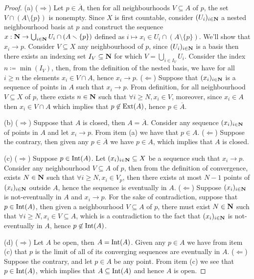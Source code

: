 \begin{proof}
(a) (\(\Rightarrow\)) Let \(p \in \overline A\), then for all neighbourhoods
\(V \subseteq A\) of \(p\), the set \(V \cap (A \setminus \{p\})\) is
nonempty. Since \(X\) is first countable, consider \((U_i)_{i \in \mathbf{N}}\) a nested
neighbourhood basis at \(p\) and construct the sequence \(x : \mathbf{N} \to \bigcup_{i
\in \mathbf{N}} U_i \cap (A \smallsetminus \{p\}) \) defined as \(i \mapsto x_i \in U_i \cap
(A \setminus \{p\})\). We'll show that \(x_i \to p\). Consider \(V \subseteq X\)
any neighbourhood of \(p\), since \((U_i)_{i \in \mathbf{N}}\) is a basis then there
exists an indexing set \(I_{V} \subseteq \mathbf{N}\) for which \(V = \bigcup_{i \in
I_V} U_i\).  Consider the index \(n \coloneq \min(I_V)\), then, from the
definition of the nested basis, we have for all \(i \geq n\) the elements \(x_i
\in V \cap A\), hence \(x_i \to p\).
(\(\Leftarrow\)) Suppose that \((x_i)_{i \in \mathbf{N}}\) is a sequence of points in
\(A\) such that \(x_i \to p\). From definition, for all neighbourhood \(V
\subseteq X\) of \(p\), there exists \(n \in \mathbf{N}\) such that \(\forall i \geq N,
x_i \in V\), moreover, since \(x_i \in A\) then \(x_i \in V \cap A\) which
implies that \(p \not\in \operatorname{Ext}(A)\), hence \(p \in \overline A\).

(b) (\(\Rightarrow\)) Suppose that \(A\) is closed, then \(A = \overline A\).
Consider any sequence \((x_i)_{i \in \mathbf{N}}\) of points in \(A\) and let
\(x_i \to p\). From item (a) we have that \(p \in A\). (\(\Leftarrow\))
Suppose the contrary, then given any \(p \in \overline A\) we have \(p \in
A\), which implies that \(A\) is closed.

(c) (\(\Rightarrow\)) Suppose \(p \in \operatorname{Int}(A)\). Let \((x_i)_{i \in
\mathbf{N}} \subseteq X\) be a sequence such that \(x_i \to p\). Consider any
neighbourhood \(V \subseteq A\) of \(p\), then from the definition of
convergence, exists \(N \in \mathbf{N}\) such that \(\forall i \geq N, x_i \in
V_p\), then there exists at most \(N - 1\) points of \((x_i)_{i \in
\mathbf{N}}\) outside \(A\), hence the sequence is eventually in \(A\).
(\(\Leftarrow\)) Suppose \((x_i)_{i \in \mathbf{N}}\) is not-eventually in
\(A\) and \(x_i \to p\). For the sake of contradiction, suppose that \(p \in
\operatorname{Int}(A)\), then given a neighbourhood \(V \subseteq A\) of \(p\), there must
exist \(N \in \mathbf{N}\) such that \(\forall i \geq N, x_i \in V \subseteq
A\), which is a contradiction to the fact that \((x_i)_{i \in \mathbf{N}}\) is
not-eventually in \(A\), hence \(p \not\in \operatorname{Int}(A)\).

(d) (\(\Rightarrow\)) Let \(A\) be open, then \(A = \operatorname{Int}(A)\). Given any \(p
\in A\) we have from item (c) that \(p\) is the limit of all of its converging
sequences are eventually in \(A\). (\(\Leftarrow\)) Suppose the contrary, and
let \(p \in A\) be any point. From item (c) we see that \(p \in \operatorname{Int}(A)\),
which implies that \(A \subseteq \operatorname{Int}(A)\) and hence \(A\) is open.
\end{proof}

